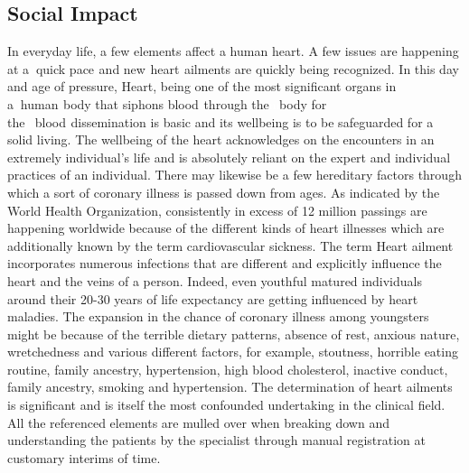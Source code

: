 \documentclass[oneside,12pt]{Classes/VTU}
\begin{document}
    \subsection{Social Impact}
    In everyday life, a few elements affect a human heart. A few issues are happening at a\tiny\textcolor{white}{n}\normalsize quick pace\tiny\textcolor{white}{s}\normalsize and new\tiny\textcolor{white}{s}\normalsize heart\tiny\textcolor{white}{s}\normalsize ailments are quickly being recognized. In this day and age of pressure, Heart, being one of the most significant organs in a\tiny\textcolor{white}{n}\normalsize human\tiny\textcolor{white}{s}\normalsize body that siphons blood\tiny\textcolor{white}{s}\normalsize through the\tiny\textcolor{white}{m}\normalsize body for the\tiny\textcolor{white}{m}\normalsize blood\tiny\textcolor{white}{s}\normalsize dissemination is basic and its wellbeing is to be safeguarded for a solid living. The wellbeing of the heart acknowledges on the encounters in an extremely individual's life and is absolutely reliant on the expert and individual practices of an individual. There may likewise be a few hereditary factors through which a sort of coronary illness is passed down from ages. As indicated by the World Health Organization, consistently in excess of 12 million passings are happening worldwide because of the different kinds of heart illnesses which are additionally known by the term cardiovascular sickness. The term Heart ailment incorporates numerous infections that are different and explicitly influence the heart and the veins of a person. Indeed, even youthful matured individuals around their 20-30 years of life expectancy are getting influenced by heart maladies. The expansion in the chance of coronary illness among youngsters might be because of the terrible dietary patterns, absence of rest, anxious nature, wretchedness and various different factors, for example, stoutness, horrible eating routine, family ancestry, hypertension, high blood cholesterol, inactive conduct, family ancestry, smoking and hypertension. The determination of heart ailments is significant and is itself the most confounded undertaking in the clinical field. All the referenced elements are mulled over when breaking down and understanding the patients by the specialist through manual registration at customary interims of time.
\end{document}
